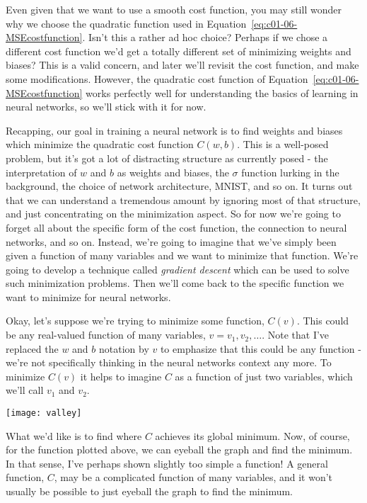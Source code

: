 Even given that we want to use a smooth cost function, you may still wonder why we choose the quadratic function used in Equation~\ref{eq:c01-06-MSEcostfunction}. Isn't this a rather ad hoc choice? Perhaps if we chose a different cost function we'd get a totally different set of minimizing weights and biases? This is a valid concern, and later we'll revisit the cost function, and make some modifications. However, the quadratic cost function of Equation~\ref{eq:c01-06-MSEcostfunction} works perfectly well for understanding the basics of learning in neural networks, so we'll stick with it for now.

Recapping, our goal in training a neural network is to find weights and biases which minimize the quadratic cost function $C(w,b)$. This is a well-posed problem, but it's got a lot of distracting structure as currently posed - the interpretation of $w$ and $b$ as weights and biases, the $\sigma$ function lurking in the background, the choice of network architecture, MNIST, and so on. It turns out that we can understand a tremendous amount by ignoring most of that structure, and just concentrating on the minimization aspect. So for now we're going to forget all about the specific form of the cost function, the connection to neural networks, and so on. Instead, we're going to imagine that we've simply been given a function of many variables and we want to minimize that function. We're going to develop a technique called \textit{gradient descent} which can be used to solve such minimization problems. Then we'll come back to the specific function we want to minimize for neural networks.

Okay, let's suppose we're trying to minimize some function, $C(v)$. This could be any real-valued function of many variables, $v=v_1,v_2,\ldots$. Note that I've replaced the $w$ and $b$ notation by $v$ to emphasize that this could be any function - we're not specifically thinking in the neural networks context any more. To minimize $C(v)$ it helps to imagine $C$ as a function of just two variables, which we'll call $v_1$ and $v_2$.


\begin{marginfigure}
\texttt{[image: valley]}
\end{marginfigure}

What we'd like is to find where $C$ achieves its global minimum. Now, of course, for the function plotted above, we can eyeball the graph and find the minimum. In that sense, I've perhaps shown slightly too simple a function! A general function, $C$, may be a complicated function of many variables, and it won't usually be possible to just eyeball the graph to find the minimum.

